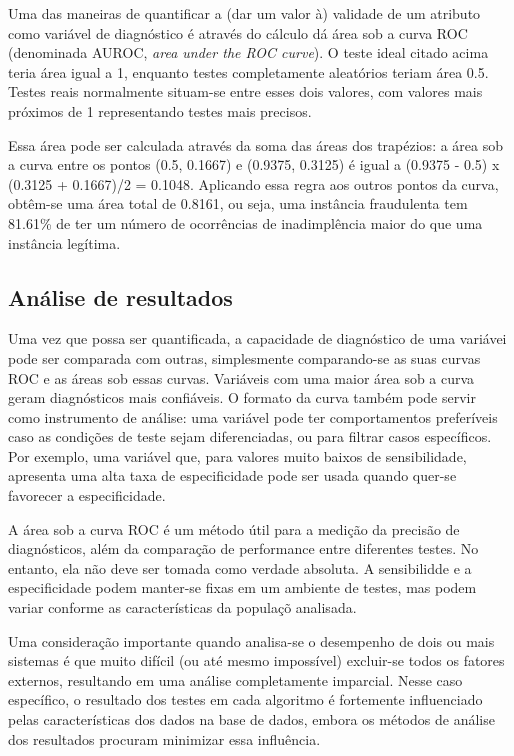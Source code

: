 Uma das maneiras de quantificar a (dar um valor à) validade de um atributo como variável de diagnóstico é através do cálculo dá área sob a curva ROC (denominada AUROC, \emph{area under the ROC curve}). O teste ideal citado acima teria área igual a 1, enquanto testes completamente aleatórios teriam área 0.5. Testes reais normalmente situam-se entre esses dois valores, com valores mais próximos de 1 representando testes mais precisos.

Essa área pode ser calculada através da soma das áreas dos trapézios: a área sob a curva entre os pontos (0.5, 0.1667) e (0.9375, 0.3125) é igual a (0.9375 - 0.5) x (0.3125 + 0.1667)/2 = 0.1048. Aplicando essa regra aos outros pontos da curva, obtêm-se uma área total de 0.8161, ou seja, uma instância fraudulenta tem 81.61\% de ter um número de ocorrências de inadimplência maior do que uma instância legítima.

\subsection{Análise de resultados}

Uma vez que possa ser quantificada, a capacidade de diagnóstico de uma variávei pode ser comparada com outras, simplesmente comparando-se as suas curvas ROC e as áreas sob essas curvas. Variáveis com uma maior área sob a curva geram diagnósticos mais confiáveis. O formato da curva também pode servir como instrumento de análise: uma variável pode ter comportamentos preferíveis caso as condições de teste sejam diferenciadas, ou para filtrar casos específicos. Por exemplo, uma variável que, para valores muito baixos de sensibilidade, apresenta uma alta taxa de especificidade pode ser usada quando quer-se favorecer a especificidade.

A área sob a curva ROC é um método útil para a medição da precisão de diagnósticos, além da comparação de performance entre diferentes testes. No entanto, ela não deve ser tomada como verdade absoluta. A sensibilidde e a especificidade podem manter-se fixas em um ambiente de testes, mas podem variar conforme as características da populaçõ analisada.

Uma consideração importante quando analisa-se o desempenho de dois ou mais sistemas é que muito difícil (ou até mesmo impossível) excluir-se todos os fatores externos, resultando em uma análise completamente imparcial. Nesse caso específico, o resultado dos testes em cada algoritmo é fortemente influenciado pelas características dos dados na base de dados, embora os métodos de análise dos resultados procuram minimizar essa influência.

